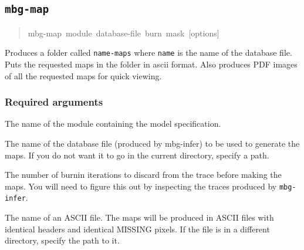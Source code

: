 


\subsection{\texttt{mbg-map}}
\label{sec:mbg-map}
\begin{quote}{\ttfamily \raggedright \noindent
mbg-map~module~database-file~burn~mask~{[}options{]}
}\end{quote}

Produces a folder called \texttt{name-maps} where \texttt{name} is the name of the database file.
Puts the requested maps in the folder in ascii format. Also produces PDF images of all
the requested maps for quick viewing.





\subsubsection{Required arguments}
\label{sec:id6}
\setcounter{listcnt0}{0}
\begin{list}{.}
{
\setlength{\rightmargin}{\leftmargin}
}
\item {} 
The name of the module containing the model specification.

\item {} 
The name of the database file (produced by mbg-infer) to be used to generate the
maps. If you do not want it to go in the current directory, specify a path.

\item {} 
The number of burnin iterations to discard from the trace before making the maps.
You will need to figure this out by inspecting the traces produced by \texttt{mbg-infer}.

\item {} 
The name of an ASCII file. The maps will be produced in ASCII files with identical
headers and identical MISSING pixels. If the file is in a different directory, specify
the path to it.

\end{list}





